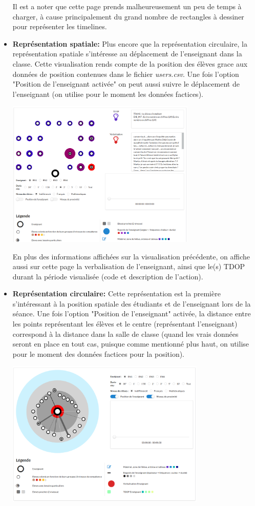 \documentclass{article}
\begin{document}
\begin{itemize}
\begin{center}
        \end{center}
        Il est a noter que cette page prends malheureusement un peu de temps à charger, à cause principalement du grand nombre de rectangles à dessiner pour représenter les timelines.\\
    \item \textbf{Représentation spatiale:} Plus encore que la représentation circulaire, la représentation spatiale s'intéresse au déplacement de l'enseignant dans la classe. Cette visualisation rends compte de la position des élèves grace aux données de position contenues dans le fichier \textit{users.csv}. Une fois l'option "Position de l'enseignant activée" on peut aussi suivre le déplacement de l'enseignant (on utilise pour le moment les données factices).
        \begin{center}
            \includegraphics[height=7cm]{rep_spatiale.png}
        \end{center}
        En plus des informations affichées sur la visualisation précédente, on affiche aussi sur cette page la verbalisation de l'enseignant, ainsi que le(s) TDOP durant la période visualisée (code et description de l'action).
    \item \textbf{Représentation circulaire:} Cette représentation est la première s'intéressant à la position spatiale des étudiants et de l'enseignant lors de la séance. Une fois l'option "Position de l'enseignant" activée, la distance entre les points représentant les élèves et le centre (représentant l'enseignant) correspond à la distance dans la salle de classe (quand les vrais données seront en place en tout cas, puisque comme mentionné plus haut, on utilise pour le moment des données factices pour la position).
        \begin{center}
            \includegraphics[height=7cm]{rep_circulaire.png}

\end{center}
\end{itemize}
\end{document}
